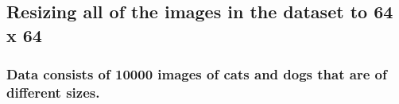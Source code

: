 \documentclass[11pt]{article}
\begin{document}
    \hypertarget{resizing-all-of-the-images-in-the-dataset-to-64-x-64}{%
\subsection{Resizing all of the images in the dataset to 64 x
64}\label{resizing-all-of-the-images-in-the-dataset-to-64-x-64}}

\hypertarget{data-consists-of-10000-images-of-cats-and-dogs-that-are-of-different-sizes.}{%
\subsubsection{Data consists of 10000 images of cats and dogs that are
of different
sizes.}\label{data-consists-of-10000-images-of-cats-and-dogs-that-are-of-different-sizes.}}
\end{document}

